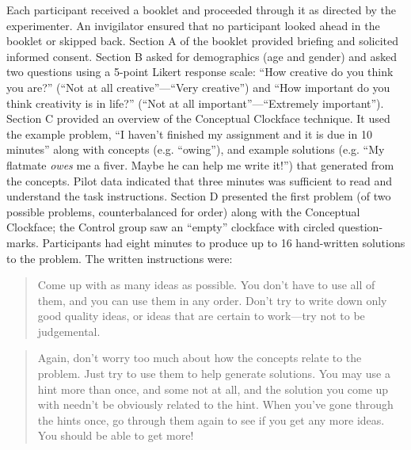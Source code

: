 \documentclass[english,man]{apa6}
\begin{document}
Each participant received a booklet and proceeded through it as directed
by the experimenter. An invigilator ensured that no participant looked
ahead in the booklet or skipped back. Section A of the booklet provided
briefing and solicited informed consent. Section B asked for
demographics (age and gender) and asked two questions using a 5-point
Likert response scale: \enquote{How creative do you think you are?}
(\enquote{Not at all creative}---\enquote{Very creative}) and
\enquote{How important do you think creativity is in life?}
(\enquote{Not at all important}---\enquote{Extremely important}).
Section C provided an overview of the Conceptual Clockface technique. It
used the example problem, \enquote{I haven't finished my assignment and
it is due in 10 minutes} along with concepts (e.g. \enquote{owing}), and
example solutions (e.g. \enquote{My flatmate \emph{owes} me a fiver.
Maybe he can help me write it!}) that generated from the concepts. Pilot
data indicated that three minutes was sufficient to read and understand
the task instructions. Section D presented the first problem (of two
possible problems, counterbalanced for order) along with the Conceptual
Clockface; the Control group saw an \enquote{empty} clockface with
circled question-marks. Participants had eight minutes to produce up to
16 hand-written solutions to the problem. The written instructions were:

\begin{quote}
Come up with as many ideas as possible. You don't have to use all of
them, and you can use them in any order. Don't try to write down only
good quality ideas, or ideas that are certain to work---try not to be
judgemental.
\end{quote}

\begin{quote}
Again, don't worry too much about how the concepts relate to the
problem. Just try to use them to help generate solutions. You may use a
hint more than once, and some not at all, and the solution you come up
with needn't be obviously related to the hint. When you've gone through
the hints once, go through them again to see if you get any more ideas.
You should be able to get more!
\end{quote}
\end{document}
